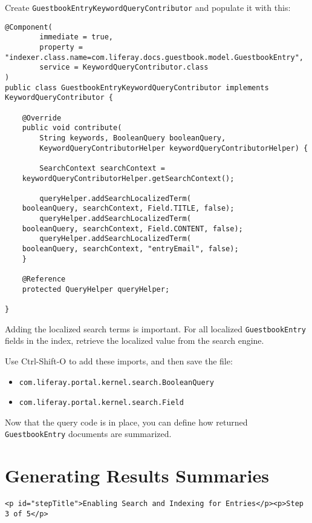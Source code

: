 Create \texttt{GuestbookEntryKeywordQueryContributor} and populate it
with this:

\begin{verbatim}
@Component(
        immediate = true,
        property = "indexer.class.name=com.liferay.docs.guestbook.model.GuestbookEntry",
        service = KeywordQueryContributor.class
)
public class GuestbookEntryKeywordQueryContributor implements KeywordQueryContributor {

    @Override
    public void contribute(
        String keywords, BooleanQuery booleanQuery,
        KeywordQueryContributorHelper keywordQueryContributorHelper) {

        SearchContext searchContext =
    keywordQueryContributorHelper.getSearchContext();

        queryHelper.addSearchLocalizedTerm(
    booleanQuery, searchContext, Field.TITLE, false);
        queryHelper.addSearchLocalizedTerm(
    booleanQuery, searchContext, Field.CONTENT, false);
        queryHelper.addSearchLocalizedTerm(
    booleanQuery, searchContext, "entryEmail", false);
    }

    @Reference
    protected QueryHelper queryHelper;

}
\end{verbatim}

Adding the localized search terms is important. For all localized
\texttt{GuestbookEntry} fields in the index, retrieve the localized
value from the search engine.

Use Ctrl-Shift-O to add these imports, and then save the file:

\begin{itemize}
\tightlist
\item
  \texttt{com.liferay.portal.kernel.search.BooleanQuery}
\item
  \texttt{com.liferay.portal.kernel.search.Field}
\end{itemize}

Now that the query code is in place, you can define how returned
\texttt{GuestbookEntry} documents are summarized.

\chapter{Generating Results
Summaries}\label{generating-results-summaries-1}

\begin{verbatim}
<p id="stepTitle">Enabling Search and Indexing for Entries</p><p>Step 3 of 5</p>
\end{verbatim}

